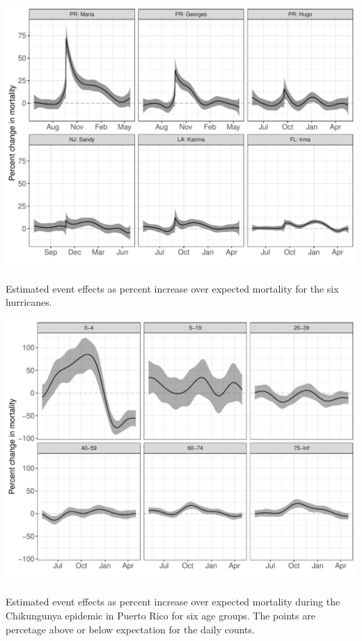 \documentclass[11pt]{article}
\begin{document}
\begin{suppfigure}[ht]
	\centering
	\includegraphics[width=1\linewidth]{figs/supp-figure-3.pdf} 
    \caption{Estimated event effects as percent increase over expected mortality for the six hurricanes.}
	\label{supp-fig:hurricane-effects}
\end{suppfigure}

\begin{suppfigure}[ht]
	\centering
	\includegraphics[width=1\linewidth]{figs/supp-figure-4.pdf} 
    \caption{Estimated event effects as percent increase over expected mortality during the Chikungunya epidemic in Puerto Rico for six age groups. The points are percetage above or below expectation for the daily counts.}
	\label{supp-fig:chikungunya-agegroups}
\end{suppfigure}
\end{document}
